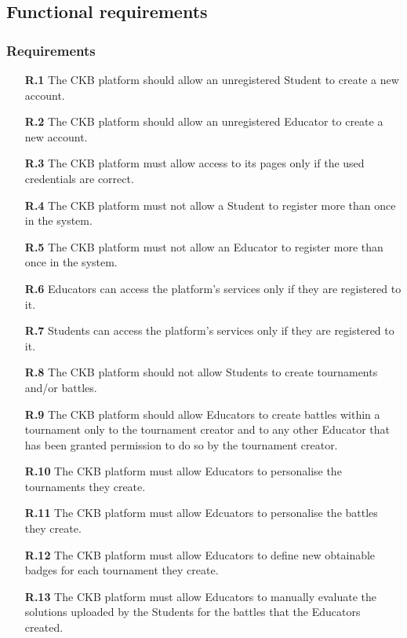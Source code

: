 \documentclass{article}
\begin{document}
{\subsection{Functional requirements}
\subsubsection{Requirements}
\begin{itemize}

    \item[\textbf{R.1}] The CKB platform should allow an unregistered Student to create a new account.
    \item[\textbf{R.2}] The CKB platform should allow an unregistered Educator to create a new account.
    \item[\textbf{R.3}] The CKB platform must allow access to its pages only if the used credentials are correct.
    \item[\textbf{R.4}] The CKB platform must not allow a Student to register more than once in the system.
    \item[\textbf{R.5}] The CKB platform must not allow an Educator to register more than once in the system.
    \item[\textbf{R.6}] Educators can access the platform's services only if they are registered to it.
    \item[\textbf{R.7}] Students can access the platform's services only if they are registered to it.
    \item[\textbf{R.8}] The CKB platform should not allow Students to create tournaments and/or battles.
    \item[\textbf{R.9}] The CKB platform should allow Educators to create battles within a tournament only to the tournament
          creator and to any other Educator that has been granted permission to do so by the tournament creator.
    \item[\textbf{R.10}] The CKB platform must allow Educators to personalise the tournaments they create.
    \item[\textbf{R.11}] The CKB platform must allow Edcuators to personalise the battles they create.
    \item[\textbf{R.12}] The CKB platform must allow Educators to define new obtainable badges for each tournament they
          create.
    \item[\textbf{R.13}] The CKB platform must allow Educators to manually evaluate the solutions uploaded by the Students for the battles that
          the Educators created.

\end{itemize}}
\end{document}
